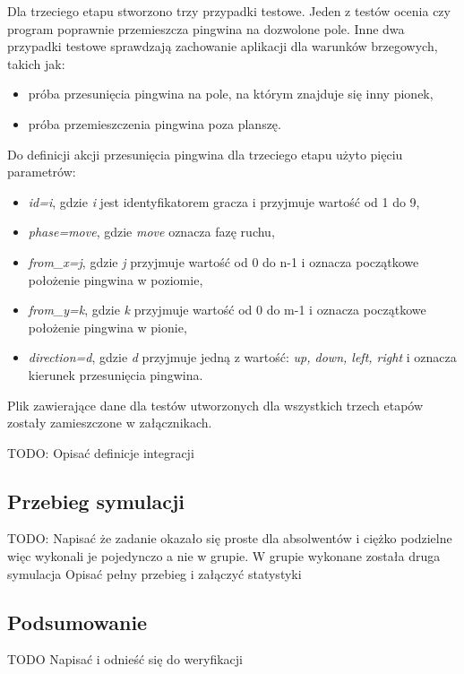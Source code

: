 Dla trzeciego etapu stworzono trzy przypadki testowe.
Jeden z testów ocenia czy program poprawnie przemieszcza pingwina na dozwolone pole.
Inne dwa przypadki testowe sprawdzają zachowanie aplikacji dla warunków brzegowych, takich jak:
\begin{itemize}
    \item próba przesunięcia pingwina na pole, na którym znajduje się inny pionek,
    \item próba przemieszczenia pingwina poza planszę.
\end{itemize}

Do definicji akcji przesunięcia pingwina dla trzeciego etapu użyto pięciu parametrów:
\begin{itemize}
    \item \textit{id=i}, gdzie \textit{i} jest identyfikatorem gracza i przyjmuje wartość od 1 do 9,
    \item \textit{phase=move}, gdzie \textit{move} oznacza fazę ruchu,
    \item \textit{from\_x=j}, gdzie \textit{j} przyjmuje wartość od 0 do n-1 i oznacza początkowe położenie pingwina w poziomie,
    \item \textit{from\_y=k}, gdzie \textit{k} przyjmuje wartość od 0 do m-1 i oznacza początkowe położenie pingwina w pionie,
    \item \textit{direction=d}, gdzie \textit{d} przyjmuje jedną z wartość: \textit{up, down, left, right} i oznacza kierunek przesunięcia pingwina.
\end{itemize}

Plik zawierające dane dla testów utworzonych dla wszystkich trzech etapów zostały zamieszczone w załącznikach.

TODO: Opisać definicje integracji

\subsection{Przebieg symulacji}
\label{penguins_simulation}

TODO: Napisać że zadanie okazało się proste dla absolwentów i ciężko podzielne więc wykonali je pojedynczo a nie w grupie.
W grupie wykonane została druga symulacja
Opisać pełny przebieg i załączyć statystyki

\subsection{Podsumowanie}

TODO Napisać i odnieść się do weryfikacji


